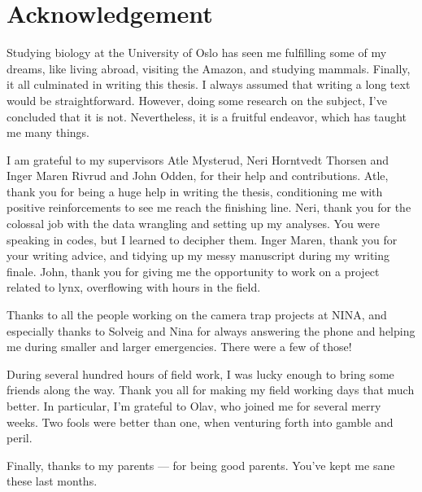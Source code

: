 \thispagestyle{plain}
\section*{Acknowledgement}
Studying biology at the University of Oslo has seen me fulfilling some of my dreams, like living abroad, visiting the Amazon, and studying mammals. Finally, it all culminated in writing this thesis.
I always assumed that writing a long text would be straightforward. 
However, doing some research on the subject, I've concluded that it is not.
Nevertheless, it is a fruitful endeavor, which has taught me many things.

I am grateful to my supervisors Atle Mysterud, Neri Horntvedt Thorsen and Inger Maren Rivrud and John Odden, for their help and contributions.
Atle, thank you for being a huge help in writing the thesis, conditioning me with positive reinforcements to see me reach the finishing line.
Neri, thank you for the colossal job with the data wrangling and setting up my analyses. You were speaking in codes, but I learned to decipher them.
Inger Maren, thank you for your writing advice, and tidying up my messy manuscript during my writing finale.
John, thank you for giving me the opportunity to work on a project related to lynx, overflowing with hours in the field.

Thanks to all the people working on the camera trap projects at NINA, and especially thanks to Solveig and Nina for always answering the phone and helping me during smaller and larger emergencies. There were a few of those!

During several hundred hours of field work, I was lucky enough to bring some friends along the way. Thank you all for making my field working days that much better. In particular, I'm grateful to Olav, who joined me for several merry weeks. Two fools were better than one, when venturing forth into gamble and peril.

Finally, thanks to my parents --- for being good parents. You've kept me sane these last months.